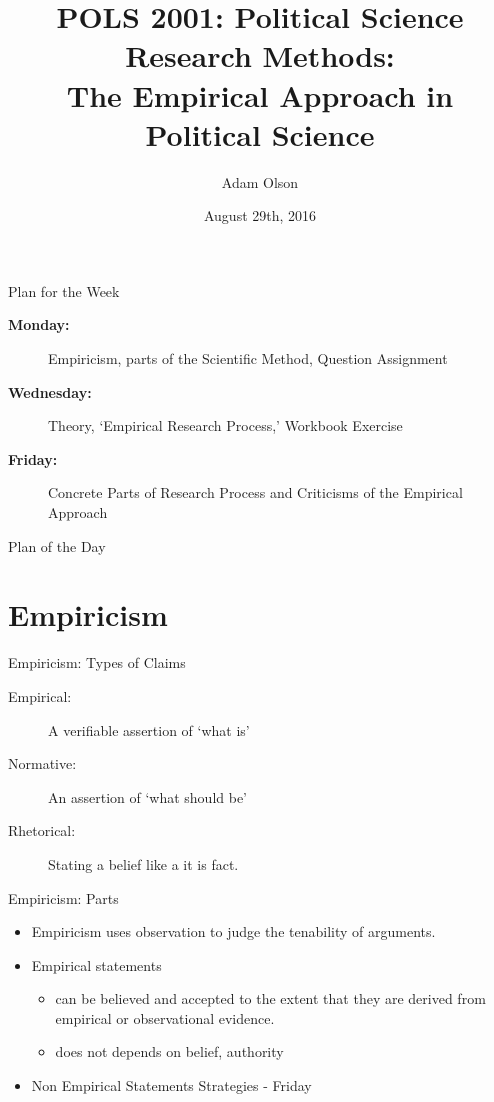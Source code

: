 \documentclass{beamer}
\title[Empirical Approach]{POLS 2001: Political Science Research Methods: \\ The Empirical Approach in Political Science}
\author[Adam Olson]{Adam Olson}
\date{August 29th, 2016}
\begin{document}
\begin{frame}
	\titlepage
\end{frame}
\begin{frame}{Plan for the Week}
\begin{description}
\item [\textbf{Monday:}] Empiricism, parts of the Scientific Method, Question Assignment
\item [\textbf{Wednesday:}] Theory, `Empirical Research Process,' Workbook Exercise 
\item [\textbf{Friday:}] Concrete Parts of Research Process and Criticisms of the Empirical Approach
\end{description}

\end{frame}
\begin{frame}{Plan of the Day}
\tableofcontents
\end{frame}


\section{Empiricism}
\begin{frame}{Empiricism: Types of Claims}
\begin{description}
\item [Empirical:] A verifiable assertion of `what is'
\item [Normative:] An assertion of `what should be'
\item [Rhetorical:] Stating a belief like a it is fact.
\end{description}
\end{frame}

\begin{frame}{Empiricism: Parts}
\begin{itemize}
\item Empiricism uses observation to judge the tenability of arguments.
\item Empirical statements 
\begin{itemize}
\item can be believed and accepted to the extent that they are derived from empirical or observational evidence. 
\item does not depends on belief, authority
\end{itemize}
\item Non Empirical Statements Strategies - Friday
\end{itemize}
\end{frame}
\end{document}
